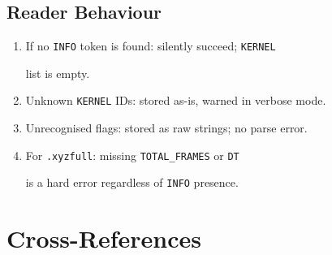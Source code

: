 \documentclass[12pt, a4paper, oneside]{article}
\begin{document}
\subsection{Reader Behaviour}


\begin{enumerate}

  \item If no \texttt{INFO} token is found: silently succeed; \texttt{KERNEL}

        list is empty.

  \item Unknown \texttt{KERNEL} IDs: stored as-is, warned in verbose mode.

  \item Unrecognised flags: stored as raw strings; no parse error.

  \item For \texttt{.xyzfull}: missing \texttt{TOTAL\_FRAMES} or \texttt{DT}

        is a hard error regardless of \texttt{INFO} presence.

\end{enumerate}



\section{Cross-References}

\end{document}
